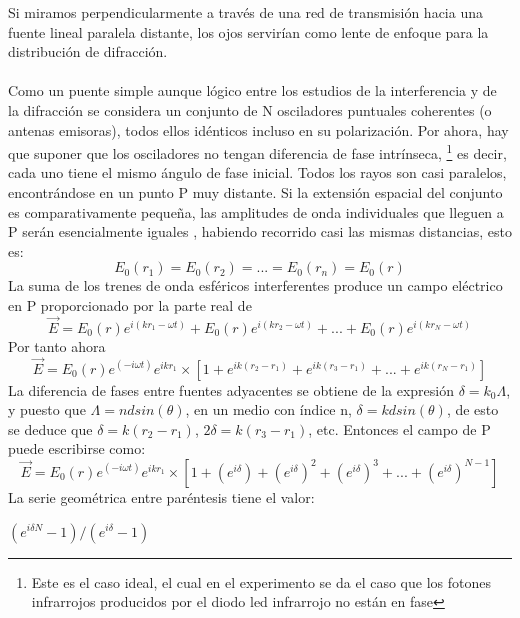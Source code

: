 \documentclass[12]{article}
\begin{document}
\begin{multicols}{2}
Si miramos perpendicularmente a través de una red de transmisión hacia una fuente lineal paralela distante, los ojos servirían como lente de enfoque para la distribución de difracción. \\ \\ 
Como un puente simple aunque lógico entre los estudios de la interferencia y de la difracción se considera un conjunto de N osciladores puntuales coherentes (o antenas emisoras), todos ellos idénticos incluso en su polarización. Por ahora, hay que suponer que los osciladores no tengan diferencia de fase intrínseca, \footnote{Este es el caso ideal, el cual en el experimento se da el caso que los fotones infrarrojos producidos por el diodo led infrarrojo no están en fase} es decir, cada uno tiene el mismo ángulo de fase inicial. Todos los rayos son casi paralelos, encontrándose en un punto P muy distante. Si la extensión espacial del conjunto es comparativamente pequeña, las amplitudes de onda individuales que lleguen a P serán esencialmente iguales , habiendo recorrido casi las mismas distancias, esto es:
\begin{equation}
E_{0}(r_{1}) = E_{0}(r_{2})= ... = E_{0}(r_{n}) = E_{0}(r)
\end{equation}
La suma de los trenes de onda esféricos interferentes   produce un campo eléctrico  en P proporcionado por la parte real de 
\begin{equation}
\vec{E} = E_{0}(r)e^{i(kr_{1} - \omega t)} +  E_{0}(r)e^{i(kr_{2} - \omega t)} + ... +  E_{0}(r)e^{i(kr_{N} - \omega t)}
\end{equation}
Por tanto ahora 
\begin{equation}
\vec{E} = E_{0}(r)e^{(-i\omega t)}e^{ikr_{1}}\times[1 + e^{ik(r_{2}-r_{1})} + e^{ik(r_{3}-r_{1})} + ... + e^{ik(r_{N}-r_{1})}]
\end{equation}
La diferencia de fases entre fuentes adyacentes se obtiene de la expresión $\delta = k_{0}\Lambda$, y puesto que $\Lambda = ndsin(\theta)$, en un medio con índice n, $\delta  = kdsin(\theta)$, de esto se deduce que $\delta = k(r_{2}-r_{1}) $, $2\delta = k(r_{3}-r_{1}) $, etc. Entonces el campo de P puede escribirse como:
\begin{equation}
\vec{E} = E_{0}(r)e^{(-i\omega t)}e^{ikr_{1}} \times[1 + (e^{i\delta}) +  (e^{i\delta})^{2} + (e^{i\delta})^{3} + ... + (e^{i\delta})^{N-1}]
\end{equation}
La serie geométrica entre paréntesis tiene el valor: 
\begin{center}
$(e^{i\delta N} -1)/(e^{i\delta} -1) $
\end{center}

\end{multicols}
\end{document}
